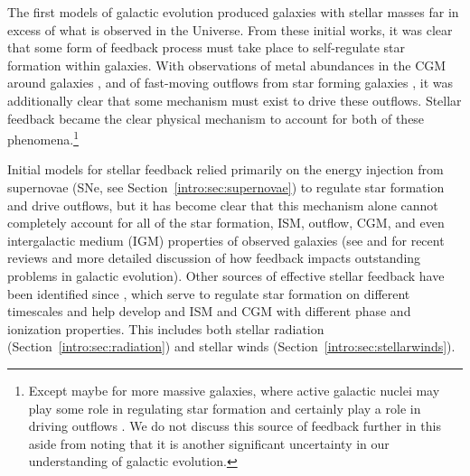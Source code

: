 The first models of galactic evolution produced galaxies with stellar masses far in excess of what is observed in the Universe.
From these initial works, it was clear that some form of feedback process must take place to self-regulate star formation within galaxies. With observations of metal abundances in the CGM around galaxies \citep[see][ for a recent review]{Tumlinson2017}, and of fast-moving outflows from star forming galaxies \citep[see][ for a review]{Veilleux2005}, it was additionally clear that some mechanism must exist to drive these outflows. Stellar feedback became the clear physical mechanism to account for both of these phenomena.\footnote{Except maybe for more massive galaxies, where active galactic nuclei may play some role in regulating star formation and certainly play a role in driving outflows \citep[e.g.][]{Fabian2012}. We do not discuss this source of feedback further in this \dissertation aside from noting that it is another significant uncertainty in our understanding of galactic evolution.}

Initial models for stellar feedback relied primarily on the energy injection from supernovae (SNe, see Section~\ref{intro:sec:supernovae}) to regulate star formation and drive outflows, but it has become clear that this mechanism alone cannot completely account for all of the star formation, ISM, outflow, CGM, and even intergalactic medium (IGM) properties of observed galaxies (see \cite{SomervilleDave2015} and \cite{NaabOstriker2017} for recent reviews and more detailed discussion of how feedback impacts outstanding problems in galactic evolution). Other sources of effective stellar feedback have been identified since \citep[e.g.][]{Agertz2013}, which serve to regulate star formation on different timescales and help develop and ISM and CGM with different phase and ionization properties. This includes both stellar radiation (Section~\ref{intro:sec:radiation}) and stellar winds (Section~\ref{intro:sec:stellarwinds}).

